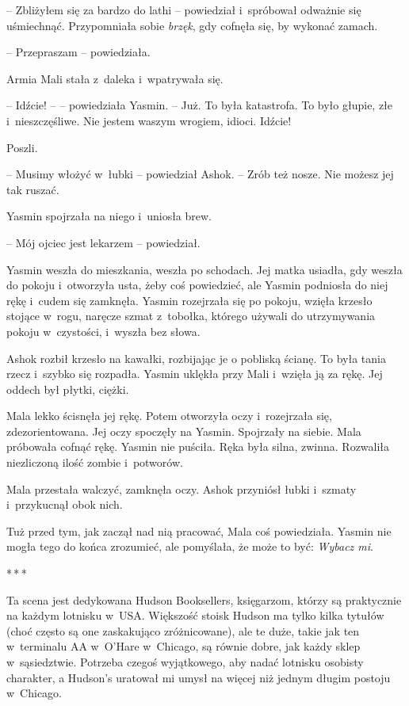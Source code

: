 \documentclass[oneside,polish,11pt,rmheadings]{mwbk}
\newcommand{\threeast}{\par\centerline{*\,*\,*}\medskip\par}
\begin{document}
-- Zbliżyłem się za bardzo do lathi -- powiedział i~spróbował odważnie się uśmiechnąć. Przypomniała sobie \textit{brzęk}, gdy cofnęła się, by wykonać zamach.

-- Przepraszam -- powiedziała.

Armia Mali stała z~daleka i~wpatrywała się.

-- Idźcie! -- -- powiedziała Yasmin. -- Już. To była katastrofa. To było głupie, złe i~nieszczęśliwe. Nie jestem waszym wrogiem, idioci. Idźcie!

Poszli.

-- Musimy włożyć w~łubki -- powiedział Ashok. -- Zrób też nosze. Nie możesz jej tak ruszać.

Yasmin spojrzała na niego i~uniosła brew.

-- Mój ojciec jest lekarzem -- powiedział.

Yasmin weszła do mieszkania, weszła po schodach. Jej matka usiadła, gdy weszła do pokoju i~otworzyła usta, żeby coś powiedzieć, ale Yasmin podniosła do niej rękę i~cudem się zamknęła. Yasmin rozejrzała się po pokoju, wzięła krzesło stojące w~rogu, naręcze szmat z~tobołka, którego używali do utrzymywania pokoju w~czystości, i~wyszła bez słowa.

Ashok rozbił krzesło na kawałki, rozbijając je o pobliską ścianę. To była tania rzecz i~szybko się rozpadła. Yasmin uklękła przy Mali i~wzięła ją za rękę. Jej oddech był płytki, ciężki.

Mala lekko ścisnęła jej rękę. Potem otworzyła oczy i~rozejrzała się, zdezorientowana. Jej oczy spoczęły na Yasmin. Spojrzały na siebie. Mala próbowała cofnąć rękę. Yasmin nie puściła. Ręka była silna, zwinna. Rozwaliła niezliczoną ilość zombie i~potworów.

Mala przestała walczyć, zamknęła oczy. Ashok przyniósł łubki i~szmaty i~przykucnął obok nich.

Tuż przed tym, jak zaczął nad nią pracować, Mala coś powiedziała. Yasmin nie mogła tego do końca zrozumieć, ale pomyślała, że może to być: \textit{Wybacz mi}. 

\bigskip
\threeast

Ta scena jest dedykowana Hudson Booksellers, księgarzom, którzy są praktycznie na każdym lotnisku w~USA. Większość stoisk Hudson ma tylko kilka tytułów (choć często są one zaskakująco zróżnicowane), ale te duże, takie jak ten w~terminalu AA w~O'Hare w~Chicago, są równie dobre, jak każdy sklep w~sąsiedztwie. Potrzeba czegoś wyjątkowego, aby nadać lotnisku osobisty charakter, a Hudson's uratował mi umysł na więcej niż jednym długim postoju w~Chicago.
\end{document}

